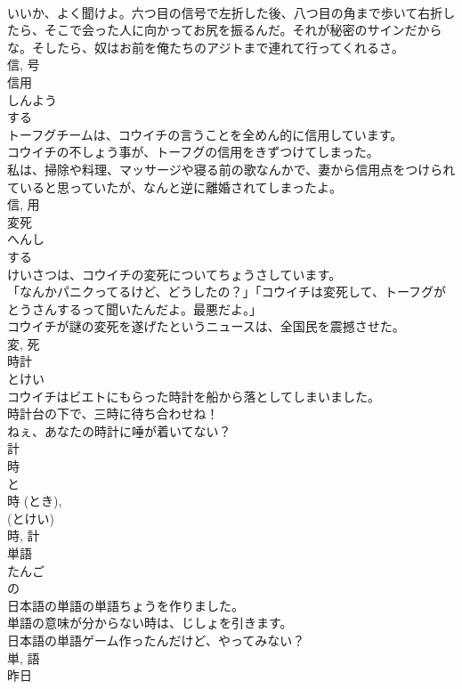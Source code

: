 \documentclass[8pt]{extreport}
\begin{document}
\begin{CJK}{UTF8}{min}
\\	いいか、よく聞けよ。六つ目の信号で左折した後、八つ目の角まで歩いて右折したら、そこで会った人に向かってお尻を振るんだ。それが秘密のサインだからな。そしたら、奴はお前を俺たちのアジトまで連れて行ってくれるさ。	
\\	信, 号	
\\	信用	
\\	しんよう	
\\	する 
\\	トーフグチームは、コウイチの言うことを全めん的に信用しています。	
\\	コウイチの不しょう事が、トーフグの信用をきずつけてしまった。	
\\	私は、掃除や料理、マッサージや寝る前の歌なんかで、妻から信用点をつけられていると思っていたが、なんと逆に離婚されてしまったよ。	
\\	信, 用	
\\	変死	
\\	へんし	
\\	する 
\\	けいさつは、コウイチの変死についてちょうさしています。	
\\	「なんかパニクってるけど、どうしたの？」「コウイチは変死して、トーフグがとうさんするって聞いたんだよ。最悪だよ。」	
\\	コウイチが謎の変死を遂げたというニュースは、全国民を震撼させた。	
\\	変, 死	
\\	時計	
\\	とけい	
\\	コウイチはビエトにもらった時計を船から落としてしまいました。	
\\	時計台の下で、三時に待ち合わせね！	
\\	ねぇ、あなたの時計に唾が着いてない？	
\\	計 
\\	時 
\\	と 
\\	時 (とき), 
\\	(とけい) 
\\	時, 計	
\\	単語	
\\	たんご	
\\	の 
\\	日本語の単語の単語ちょうを作りました。	
\\	単語の意味が分からない時は、じしょを引きます。	
\\	日本語の単語ゲーム作ったんだけど、やってみない？	
\\	単, 語	
\\	昨日	

\end{CJK}
\end{document}
